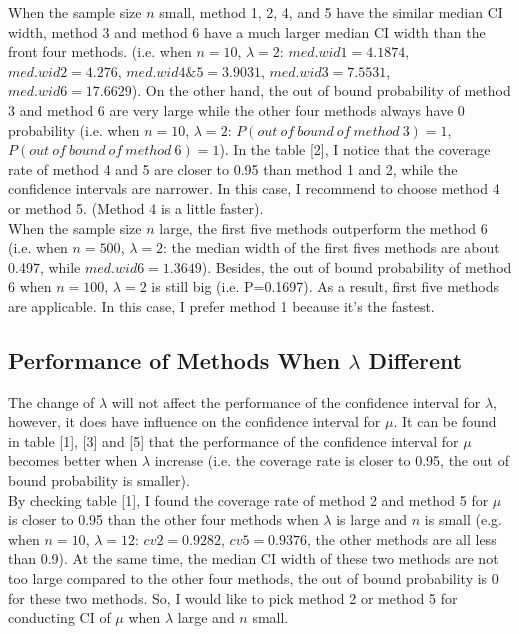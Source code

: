 \documentclass[12pt]{article}
\begin{document}
When the sample size $n$ small,  method 1, 2, 4, and 5 have the similar median CI width, method 3 and method 6 have a much larger median CI width than the front four methods. (i.e. when $n=10$, $\lambda=2$:  $med.wid1=4.1874$, $med.wid2=4.276$, $med.wid4\&5=3.9031$, $med.wid3=7.5531$, $med.wid6=17.6629$). On the other hand, the out of bound probability of method 3 and method 6 are very large while the other four methods always have 0 probability (i.e. when $n=10$, $\lambda=2$:  $P(out \ of \ bound\ of \ method \ 3)=1$, $P(out \ of \ bound\ of \ method \ 6)=1$).  In the table [2], I notice that the coverage rate of method 4 and 5 are closer to 0.95 than method 1 and 2, while the confidence intervals are narrower. In this case, I recommend to choose method 4 or method 5. (Method 4 is a little faster).\\

When the sample size $n$ large, the first five methods outperform the method 6 (i.e. when $n=500$, $\lambda=2$: the median width of the first fives methods are about 0.497, while $med.wid6 = 1.3649$). Besides, the out of bound probability of method 6 when $n=100$, $\lambda=2$ is still big (i.e. P=0.1697). As a result, first five methods are applicable. In this case, I prefer method 1 because it's the fastest.\\

\subsection{Performance of Methods When $\lambda$ Different}
The change of $\lambda$ will not affect the performance of the confidence interval for $\lambda$, however, it does have influence on the confidence interval for $\mu$. It can be found in table [1], [3] and [5] that the performance of the confidence interval for $\mu$ becomes better when $\lambda$ increase (i.e. the coverage rate is closer to 0.95, the out of bound probability is smaller).  \\

By checking table [1], I found the coverage rate of method 2 and method 5 for $\mu$ is closer to 0.95 than the other four methods when $\lambda$ is large and $n$ is small (e.g. when $n=10$, $\lambda=12$: $cv2=0.9282$, $cv5=0.9376$, the other methods are all less than 0.9). At the same time, the median CI width of these two methods are not too large compared to the other four methods, the out of bound probability is 0 for these two methods. So, I would like to pick method 2 or method 5 for conducting CI of $\mu$ when $\lambda$ large and $n$ small. \\
\end{document}

